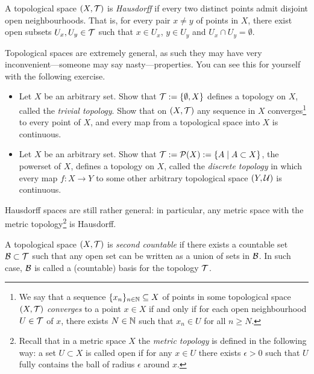 \begin{definition}
	A topological space $(X, \mathcal{T})$ is \emph{Hausdorff} if every two distinct points admit disjoint open neighbourhoods. That is, for every pair $x\neq y$ of points in $X$, there exist open subsets $U_x, U_y\in\mathcal{T}$ such that $x\in U_x$, $y\in U_y$ and $U_x \cap U_y = \emptyset$.
\end{definition}

Topological spaces are extremely general, as such they may have very inconvenient---someone may say nasty---properties.
You can see this for yourself with the following exercise.

\begin{exercise}
	\begin{itemize}
		\item Let $X$ be an arbitrary set. Show that $\mathcal{T}:=\{\emptyset, X\}$ defines a topology on $X$, called the \emph{trivial topology}. Show that on $(X, \mathcal{T})$ any sequence in $X$ converges\footnote{We say that a sequence $\{x_n\}_{n\in\mathbb{N}}\subseteq X$ of points in some topological space $(X, \mathcal{T})$ \emph{converges} to a point $x\in X$ if and only if for each open neighbourhood $U\in\mathcal{T}$ of $x$, there exists $N\in\mathbb{N}$ such that $x_n\in U$ for all $n\geq N$.} to every point of $X$, and every map from a topological space into $X$ is continuous.
		\item Let $X$ be an arbitrary set. Show that $\mathcal{T}:=\mathcal{P}(X) := \{ A \mid A\subset X \}$, the powerset of $X$, defines a topology on $X$, called the \emph{discrete topology} in which every map $f : X \to Y$ to some other arbitrary topological space $(Y, \mathcal{U})$ is continuous.
	\end{itemize}
\end{exercise}

Hausdorff spaces are still rather general: in particular, any metric space with the metric topology\footnote{Recall that in a metric space $X$ the \emph{metric topology} is defined in the following way: a set $U\subset X$ is called open if for any $x\in U$ there exists $\epsilon>0$ such that $U$ fully contains the ball of radius $\epsilon$ around $x$.} is Hausdorff.

\begin{definition}
	A topological space $(X, \mathcal{T})$ is \emph{second countable} if there exists a countable set $\mathcal{B}\subset\mathcal{T}$ such that any open set can be written as a union of sets in $\mathcal{B}$.
	In such case, $\mathcal{B}$ is called a (countable) basis for the topology $\mathcal{T}$.
\end{definition}

